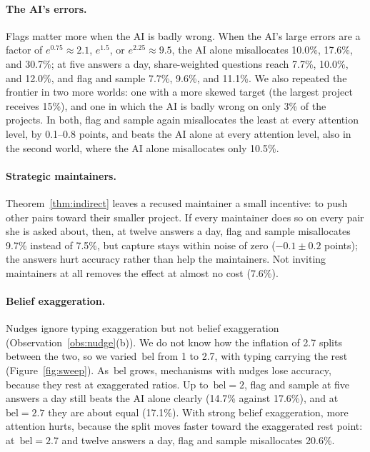 \documentclass[doubleblind]{ecai}
\theoremstyle{remark}
\newcommand{\bel}{\mathrm{bel}}
\begin{document}
\paragraph{The AI's errors.}
Flags matter more when the AI is badly wrong. When the AI's large errors are a factor of $e^{0.75}\approx 2.1$, $e^{1.5}$, or $e^{2.25}\approx 9.5$, the AI alone misallocates 10.0\%, 17.6\%, and 30.7\%; at five answers a day, share-weighted questions reach 7.7\%, 10.0\%, and 12.0\%, and flag and sample 7.7\%, 9.6\%, and 11.1\%. We also repeated the frontier in two more worlds: one with a more skewed target (the largest project receives 15\%), and one in which the AI is badly wrong on only 3\% of the projects. In both, flag and sample again misallocates the least at every attention level, by 0.1--0.8 points, and beats the AI alone at every attention level, also in the second world, where the AI alone misallocates only 10.5\%.

\paragraph{Strategic maintainers.}
Theorem~\ref{thm:indirect} leaves a recused maintainer a small incentive: to push other pairs toward their smaller project. If every maintainer does so on every pair she is asked about, then, at twelve answers a day, flag and sample misallocates 9.7\% instead of 7.5\%, but capture stays within noise of zero ($-0.1\pm 0.2$ points); the answers hurt accuracy rather than help the maintainers. Not inviting maintainers at all removes the effect at almost no cost (7.6\%).

\paragraph{Belief exaggeration.}
Nudges ignore typing exaggeration but not belief exaggeration (Observation~\ref{obs:nudge}(b)). We do not know how the inflation of 2.7 splits between the two, so we varied~$\bel$ from 1 to 2.7, with typing carrying the rest (Figure~\ref{fig:sweep}). As~$\bel$ grows, mechanisms with nudges lose accuracy, because they rest at exaggerated ratios. Up to~$\bel = 2$, flag and sample at five answers a day still beats the AI alone clearly (14.7\% against 17.6\%), and at~$\bel = 2.7$ they are about equal (17.1\%). With strong belief exaggeration, more attention hurts, because the split moves faster toward the exaggerated rest point: at~$\bel = 2.7$ and twelve answers a day, flag and sample misallocates 20.6\%.
\end{document}
